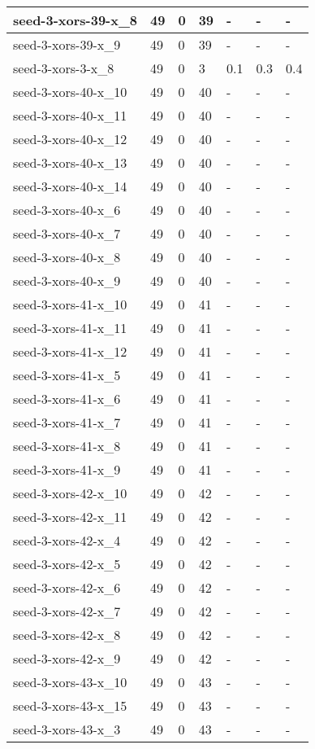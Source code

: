 \begin{scriptsize}
\begin{longtable}{|p{5cm}|l|l|l|l|l|l|}
seed-3-xors-39-x\_8&49&0&39&-&-&- \\ \hline 
seed-3-xors-39-x\_9&49&0&39&-&-&- \\ \hline 
seed-3-xors-3-x\_8&49&0&3&0.1&0.3&0.4 \\ \hline 
seed-3-xors-40-x\_10&49&0&40&-&-&- \\ \hline 
seed-3-xors-40-x\_11&49&0&40&-&-&- \\ \hline 
seed-3-xors-40-x\_12&49&0&40&-&-&- \\ \hline 
seed-3-xors-40-x\_13&49&0&40&-&-&- \\ \hline 
seed-3-xors-40-x\_14&49&0&40&-&-&- \\ \hline 
seed-3-xors-40-x\_6&49&0&40&-&-&- \\ \hline 
seed-3-xors-40-x\_7&49&0&40&-&-&- \\ \hline 
seed-3-xors-40-x\_8&49&0&40&-&-&- \\ \hline 
seed-3-xors-40-x\_9&49&0&40&-&-&- \\ \hline 
seed-3-xors-41-x\_10&49&0&41&-&-&- \\ \hline 
seed-3-xors-41-x\_11&49&0&41&-&-&- \\ \hline 
seed-3-xors-41-x\_12&49&0&41&-&-&- \\ \hline 
seed-3-xors-41-x\_5&49&0&41&-&-&- \\ \hline 
seed-3-xors-41-x\_6&49&0&41&-&-&- \\ \hline 
seed-3-xors-41-x\_7&49&0&41&-&-&- \\ \hline 
seed-3-xors-41-x\_8&49&0&41&-&-&- \\ \hline 
seed-3-xors-41-x\_9&49&0&41&-&-&- \\ \hline 
seed-3-xors-42-x\_10&49&0&42&-&-&- \\ \hline 
seed-3-xors-42-x\_11&49&0&42&-&-&- \\ \hline 
seed-3-xors-42-x\_4&49&0&42&-&-&- \\ \hline 
seed-3-xors-42-x\_5&49&0&42&-&-&- \\ \hline 
seed-3-xors-42-x\_6&49&0&42&-&-&- \\ \hline 
seed-3-xors-42-x\_7&49&0&42&-&-&- \\ \hline 
seed-3-xors-42-x\_8&49&0&42&-&-&- \\ \hline 
seed-3-xors-42-x\_9&49&0&42&-&-&- \\ \hline 
seed-3-xors-43-x\_10&49&0&43&-&-&- \\ \hline 
seed-3-xors-43-x\_15&49&0&43&-&-&- \\ \hline 
seed-3-xors-43-x\_3&49&0&43&-&-&- \\ \hline 

\end{longtable}
\end{scriptsize}
